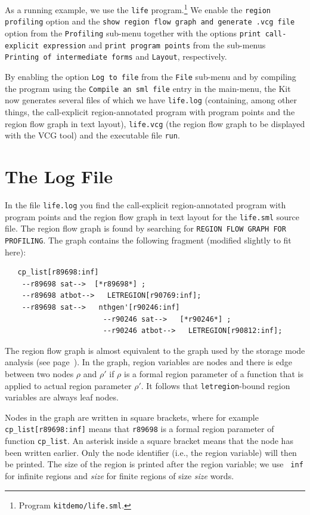 \documentclass[12pt]{book}
\begin{document}
As a running example, we use the 
%
{\tt life} program.\footnote{Program {\tt kitdemo/life.sml}.}  We
enable the {\tt region profiling} option and the {\tt show region flow
  graph and generate .vcg file} option from the {\tt Profiling}
sub-menu together with the options {\tt print call-explicit
  expression} and {\tt print program points} from the sub-menus {\tt
  Printing of intermediate forms} and {\tt Layout}, respectively.

By enabling the option {\tt Log to file} from the {\tt File} sub-menu
and by compiling the program using the {\tt Compile an sml file} entry in
the main-menu, the Kit now generates several files of which we have
{\tt life.log} (containing, among other things, the call-explicit
region-annotated program with program points and the region flow graph
in text layout), {\tt life.vcg} (the region flow graph to be
displayed with the VCG tool) and the executable file {\tt run}.

\section{The Log File}
In the file {\tt life.log} you find the call-explicit region-annotated
program with program points and the region flow graph in text layout
for the {\tt life.sml} source file.  The region flow graph is found by
searching for \texttt{REGION FLOW GRAPH FOR PROFILING}. The graph
contains the following fragment (modified slightly to fit here):\label{reg_flow_graph.ex}
\begin{verbatim}
   cp_list[r89698:inf]
    --r89698 sat-->  [*r89698*] ;
    --r89698 atbot-->   LETREGION[r90769:inf];
    --r89698 sat-->   nthgen'[r90246:inf]   
                       --r90246 sat-->   [*r90246*] ;
                       --r90246 atbot-->   LETREGION[r90812:inf];
\end{verbatim}
The region flow graph is almost equivalent to the graph used by the
storage mode analysis (see page~\pageref{region flow graph}). In the
graph, region variables are nodes and there is edge between two nodes
$\rho$ and $\rho'$ if $\rho$ is a formal region parameter of a
function that is applied to actual region parameter $\rho'$. It
follows that \texttt{letregion}-bound region variables are always leaf
nodes.

Nodes in the graph are written in square brackets, where for example
\texttt{cp\_list[r89698:inf]} means that \texttt{r89698} is a formal
region parameter of function \texttt{cp\_list}. An asterisk inside a
square bracket means that the node has been written earlier. Only the
node identifier (i.e., the region variable) will then be printed. The
size of the region is printed after the region variable; we use {\tt
  inf} for infinite regions and {\em size\/} for finite regions of size
{\em size\/} words.
\end{document}

